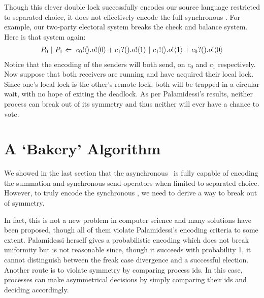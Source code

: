 Though this clever double lock successfully encodes our source language restricted to separated choice, it does not effectively encode the full synchronous \picalc.  
For example, our two-party electoral system breaks the check and balance system.  Here is that system again:
\begin{align}
	P_0\ |\  P_1 \Leftarrow\  {c_0}!\langle{}\rangle. {o}!\langle{0}\rangle + {c_1}?({}). {o}!\langle{1}\rangle \ |\  {c_1}!\langle{}\rangle. {o}!\langle{1}\rangle + {c_0}?({}). {o}!\langle{0}\rangle
\end{align}
Notice that the encoding of the senders will both send, on $c_0$ and $c_1$ respectively.  
Now suppose that both receivers are running and have acquired their local lock.  
Since one's local lock is the other's remote lock, both will be trapped in a circular wait, with no hope of exiting the deadlock.  
As per Palamidessi's results, neither process can break out of its symmetry and thus neither will ever have a chance to vote.

\section{A `Bakery' Algorithm}
We showed in the last section that the asynchronous \picalc\ is fully capable of encoding the summation and synchronous send operators when limited to separated choice.
However, to truly encode the synchronous \picalc, we need to derive a way to break out of symmetry.

In fact, this is not a new problem in computer science and many solutions have been proposed, though all of them violate Palamidessi's encoding criteria to some extent.
Palamidessi herself gives a probabilistic encoding \cite{palam01} which does not break uniformity  but is not reasonable  since, though it succeeds with probability 1, it cannot distinguish between the freak case divergence and a successful election.
Another route is to violate symmetry by comparing process ids.
In this case, processes can make asymmetrical decisions by simply comparing their ids and deciding accordingly.

